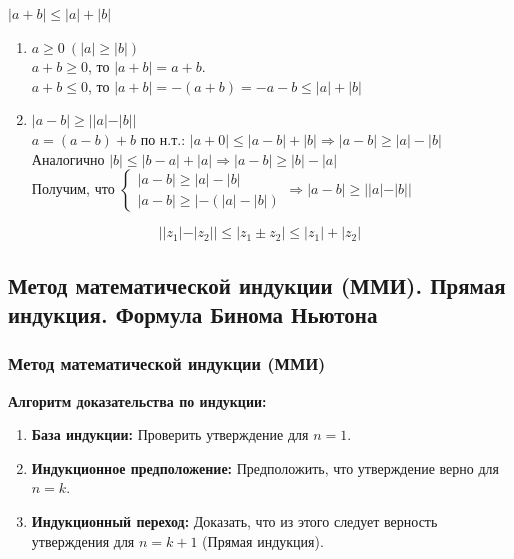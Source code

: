 \documentclass[12pt, a4paper]{article}
\begin{document}
\begin{centering}
\begin{tcolorbox}[title=Доказательство, breakable]
$|a+b| \leq |a| + |b|$
\begin{enumerate}
    \item $a \geq 0\ (|a| \geq |b|)$ \\
    $a + b \geq 0$, то $|a+b| = a+b$.\\
    $a + b \leq 0$, то $|a+b| = -(a+b) = -a-b \leq |a|+|b|$
    \item $|a-b| \geq ||a|-|b||$\\
    $a = (a - b) + b$ по н.т.: $|a + 0| \leq |a-b|+|b| \Rightarrow |a-b| \geq |a|-|b|$ \\
    Аналогично $|b| \leq |b-a|+|a| \Rightarrow |a-b| \geq |b|-|a|$ \\
    Получим, что 
    $
    \begin{cases}
        |a-b| \geq |a|-|b|\\
        |a-b| \geq |-(|a|-|b|)
    \end{cases}
    \Rightarrow |a-b| \geq ||a|-|b||
    $
\end{enumerate}
\end{tcolorbox}

\begin{tcolorbox}[title=Следствие, breakable]
$$||z_1| - |z_2|| \leq |z_1 \pm z_2| \leq |z_1| + |z_2|$$
\end{tcolorbox}

\subsection{Метод математической индукции (ММИ). Прямая индукция. Формула Бинома Ньютона}

\subsubsection{Метод математической индукции (ММИ)}
\begin{tcolorbox}
\textbf{Алгоритм доказательства по индукции:}
\begin{enumerate}
    \item \textbf{База индукции:} Проверить утверждение для $n = 1$.
    \item \textbf{Индукционное предположение:} Предположить, что утверждение верно для $n = k$.
    \item \textbf{Индукционный переход:} Доказать, что из этого следует верность утверждения для $n = k+1$ (Прямая индукция).
\end{enumerate}
\end{tcolorbox}


\end{centering}
\end{document}
